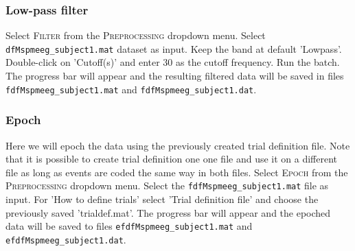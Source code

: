\subsubsection{Low-pass filter}
 Select \textsc{Filter} from the \textsc{Preprocessing} dropdown menu. Select \texttt{dfMspmeeg\_subject1.mat} dataset as input.  Keep the band at default  'Lowpass'. Double-click on 'Cutoff(s)' and enter 30 as the cutoff frequency. Run the batch. The progress bar will appear and the resulting filtered data will be saved in files \texttt{fdfMspmeeg\_subject1.mat} and \texttt{fdfMspmeeg\_subject1.dat}.

\subsubsection{Epoch}
Here we will epoch the data using the previously created trial definition file. Note that it is possible to create trial definition one one file and use it on a different file as long as events are coded the same way in both files.  Select \textsc{Epoch} from the \textsc{Preprocessing} dropdown menu. Select the \texttt{fdfMspmeeg\_subject1.mat} file as input. For 'How to define trials' select 'Trial definition file' and choose the previously saved 'trialdef.mat'. The progress bar will appear and the epoched data will be saved to files \texttt{efdfMspmeeg\_subject1.mat} and \texttt{efdfMspmeeg\_subject1.dat}.

